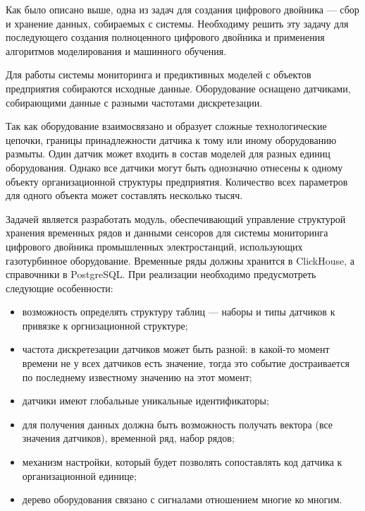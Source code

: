 Как было описано выше, одна из задач для создания цифрового двойника --- сбор и хранение данных, собираемых с системы. Необходиму решить эту задачу для последующего создания полноценного цифрового двойника и применения алгоритмов моделирования и машинного обучения.

Для работы системы мониторинга и предиктивных моделей с объектов предприятия собираются исходные данные. Оборудование оснащено датчиками, собирающими данные с разными частотами дискретезации.

Так как оборудование взаимосвязано и образует сложные технологические цепочки, границы принадлежности датчика к тому или иному оборудованию размыты. Один датчик может входить в состав моделей для разных единиц оборудования. Однако все датчики могут быть однозначно отнесены к одному объекту организационной структуры предприятия. Количество всех параметров для одного объекта может составлять несколько тысяч.

Задачей является разработать модуль, обеспечивающий управление структурой хранения временных рядов и данными сенсоров для системы мониторинга цифрового двойника промышленных электростанций, использующих газотурбинное оборудование. Временные ряды должны хранится в ClickHouse, а справочники в PostgreSQL. При реализации необходимо предусмотреть следующие особенности:

\begin{itemize}
    \item возможность определять структуру таблиц --- наборы и типы датчиков к привязке к оргнизационной структуре;
    \item частота дискретезации датчиков может быть разной: в какой-то момент времени не у всех датчиков есть значение, тогда это событие достраивается по последнему известному значению на этот момент;
    \item датчики имеют глобальные уникальные идентификаторы;
    \item для получения данных должна быть возможность получать вектора (все значения датчиков), временной ряд, набор рядов;
    \item механизм настройки, который будет позволять сопоставлять код датчика к организационной единице;
    \item дерево оборудования связано с сигналами отношением многие ко многим.
\end{itemize}